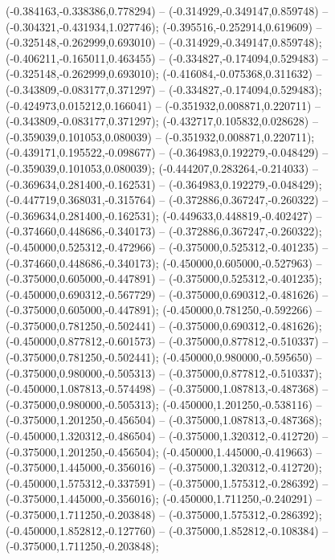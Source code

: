  (-0.384163,-0.338386,0.778294) -- (-0.314929,-0.349147,0.859748) -- (-0.304321,-0.431934,1.027746);
 (-0.395516,-0.252914,0.619609) -- (-0.325148,-0.262999,0.693010) -- (-0.314929,-0.349147,0.859748);
 (-0.406211,-0.165011,0.463455) -- (-0.334827,-0.174094,0.529483) -- (-0.325148,-0.262999,0.693010);
 (-0.416084,-0.075368,0.311632) -- (-0.343809,-0.083177,0.371297) -- (-0.334827,-0.174094,0.529483);
 (-0.424973,0.015212,0.166041) -- (-0.351932,0.008871,0.220711) -- (-0.343809,-0.083177,0.371297);
 (-0.432717,0.105832,0.028628) -- (-0.359039,0.101053,0.080039) -- (-0.351932,0.008871,0.220711);
 (-0.439171,0.195522,-0.098677) -- (-0.364983,0.192279,-0.048429) -- (-0.359039,0.101053,0.080039);
 (-0.444207,0.283264,-0.214033) -- (-0.369634,0.281400,-0.162531) -- (-0.364983,0.192279,-0.048429);
 (-0.447719,0.368031,-0.315764) -- (-0.372886,0.367247,-0.260322) -- (-0.369634,0.281400,-0.162531);
 (-0.449633,0.448819,-0.402427) -- (-0.374660,0.448686,-0.340173) -- (-0.372886,0.367247,-0.260322);
 (-0.450000,0.525312,-0.472966) -- (-0.375000,0.525312,-0.401235) -- (-0.374660,0.448686,-0.340173);
 (-0.450000,0.605000,-0.527963) -- (-0.375000,0.605000,-0.447891) -- (-0.375000,0.525312,-0.401235);
 (-0.450000,0.690312,-0.567729) -- (-0.375000,0.690312,-0.481626) -- (-0.375000,0.605000,-0.447891);
 (-0.450000,0.781250,-0.592266) -- (-0.375000,0.781250,-0.502441) -- (-0.375000,0.690312,-0.481626);
 (-0.450000,0.877812,-0.601573) -- (-0.375000,0.877812,-0.510337) -- (-0.375000,0.781250,-0.502441);
 (-0.450000,0.980000,-0.595650) -- (-0.375000,0.980000,-0.505313) -- (-0.375000,0.877812,-0.510337);
 (-0.450000,1.087813,-0.574498) -- (-0.375000,1.087813,-0.487368) -- (-0.375000,0.980000,-0.505313);
 (-0.450000,1.201250,-0.538116) -- (-0.375000,1.201250,-0.456504) -- (-0.375000,1.087813,-0.487368);
 (-0.450000,1.320312,-0.486504) -- (-0.375000,1.320312,-0.412720) -- (-0.375000,1.201250,-0.456504);
 (-0.450000,1.445000,-0.419663) -- (-0.375000,1.445000,-0.356016) -- (-0.375000,1.320312,-0.412720);
 (-0.450000,1.575312,-0.337591) -- (-0.375000,1.575312,-0.286392) -- (-0.375000,1.445000,-0.356016);
 (-0.450000,1.711250,-0.240291) -- (-0.375000,1.711250,-0.203848) -- (-0.375000,1.575312,-0.286392);
 (-0.450000,1.852812,-0.127760) -- (-0.375000,1.852812,-0.108384) -- (-0.375000,1.711250,-0.203848);
